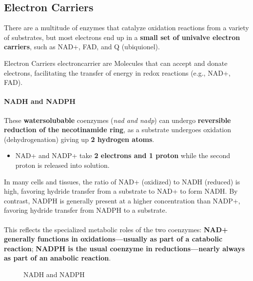 \documentclass[../main.tex]{subfiles}
\begin{document}
\subsection{Electron Carriers}
There are a multitude of enzymes that catalyze oxidation reactions from a variety of substrates, but most electrons end up in a \textbf{small set of univalve electron carriers}, such as NAD+, FAD, and Q (ubiquionel).  

\begin{DefWithTitle}{Electron Carriers}
	\gls{electroncarrier} are Molecules that can accept and donate electrons, facilitating the transfer of energy in redox reactions (e.g., NAD+, FAD).
\end{DefWithTitle}

\paragraph{NADH and NADPH}
These \textbf{watersolubable} coenzymes (\textit{\gls{nad} and \gls{nadp}}) can undergo \textbf{reversible reduction of the necotinamide ring}, as a substrate undergoes oxidation (dehydrogenation) giving up \textbf{2 hydrogen atoms}.
\begin{itemize}
	\item NAD+ and NADP+ take \textbf{2 electrons and 1 proton} while the second proton is released into solution. 
\end{itemize}
In many cells and tissues, the ratio of  NAD+ (oxidized) to NADH (reduced) is high, favoring hydride transfer from a substrate to NAD+ to form NADH. By contrast, NADPH is generally present at a higher concentration than NADP+, favoring hydride transfer from NADPH to a substrate. \\
\\
This reflects the specialized metabolic roles of the two coenzymes:\textbf{ NAD+ generally functions in oxidations—usually as part of a catabolic reaction}; \textbf{NADPH is the usual coenzyme in reductions—nearly always as part of an anabolic reaction}.

\begin{figure}[H]
	\centering
	\caption{NADH and NADPH}
\end{figure}
\end{document}
